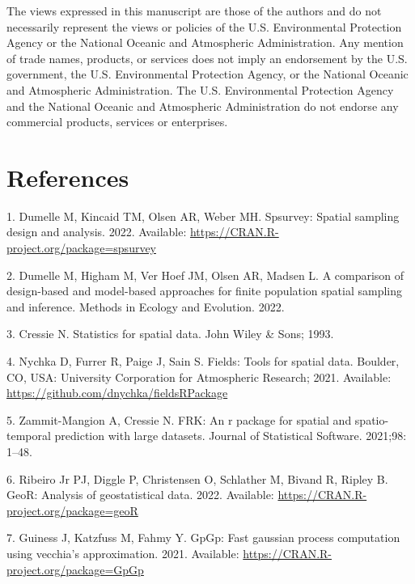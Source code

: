 \documentclass[10pt,letterpaper]{article}
\begin{document}
The views expressed in this manuscript are those of the authors and do
not necessarily represent the views or policies of the U.S.
Environmental Protection Agency or the National Oceanic and Atmospheric
Administration. Any mention of trade names, products, or services does
not imply an endorsement by the U.S. government, the U.S. Environmental
Protection Agency, or the National Oceanic and Atmospheric
Administration. The U.S. Environmental Protection Agency and the
National Oceanic and Atmospheric Administration do not endorse any
commercial products, services or enterprises.

\hypertarget{references}{%
\section*{References}\label{references}}

\hypertarget{refs}{}
\leavevmode\hypertarget{ref-dumelle2022spsurvey}{}%
1. Dumelle M, Kincaid TM, Olsen AR, Weber MH. Spsurvey: Spatial sampling
design and analysis. 2022. Available:
\url{https://CRAN.R-project.org/package=spsurvey}

\leavevmode\hypertarget{ref-dumelle2022comparison}{}%
2. Dumelle M, Higham M, Ver Hoef JM, Olsen AR, Madsen L. A comparison of
design-based and model-based approaches for finite population spatial
sampling and inference. Methods in Ecology and Evolution. 2022.

\leavevmode\hypertarget{ref-cressie1993statistics}{}%
3. Cressie N. Statistics for spatial data. John Wiley \& Sons; 1993.

\leavevmode\hypertarget{ref-nychka2021fields}{}%
4. Nychka D, Furrer R, Paige J, Sain S. Fields: Tools for spatial data.
Boulder, CO, USA: University Corporation for Atmospheric Research; 2021.
Available: \url{https://github.com/dnychka/fieldsRPackage}

\leavevmode\hypertarget{ref-zammitmangion2021FRK}{}%
5. Zammit-Mangion A, Cressie N. FRK: An r package for spatial and
spatio-temporal prediction with large datasets. Journal of Statistical
Software. 2021;98: 1--48.

\leavevmode\hypertarget{ref-ribiero2022geoR}{}%
6. Ribeiro Jr PJ, Diggle P, Christensen O, Schlather M, Bivand R, Ripley
B. GeoR: Analysis of geostatistical data. 2022. Available:
\url{https://CRAN.R-project.org/package=geoR}

\leavevmode\hypertarget{ref-guiness2021gpgp}{}%
7. Guiness J, Katzfuss M, Fahmy Y. GpGp: Fast gaussian process
computation using vecchia's approximation. 2021. Available:
\url{https://CRAN.R-project.org/package=GpGp}
\end{document}

